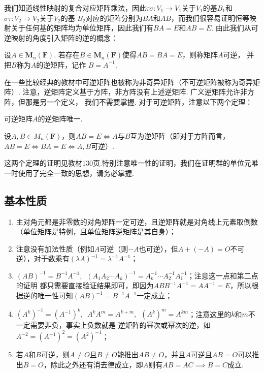我们知道线性映射的复合对应矩阵乘法，因此$\tau\sigma:V_1\to V_1$关于$V_1$的基$B_1$和$\sigma\tau:V_2\to V_2$关于$V_2$的基
$B_2$对应的矩阵分别为$BA$和$AB$，而我们很容易证明恒等映射关于任何基的矩阵均为单位矩阵，因此我们有$BA=E$和$AB=E$.
由此我们从可逆映射的角度引入矩阵的逆的概念：
\begin{definition}
    设$A \in \mathbf{M}_n(\mathbf{F})$. 若存在$B \in \mathbf{M}_n(\mathbf{F})$使得$AB=BA=E$，则称矩阵$A$可逆，
    并把$B$称为$A$的逆矩阵，记作 $ B = A^{-1} $.
\end{definition}
在一些比较经典的教材中可逆矩阵也被称为非奇异矩阵（不可逆矩阵被称为奇异矩阵）.
注意，逆矩阵定义基于方阵，非方阵没有上述逆矩阵. 广义逆矩阵允许非方阵，但那是另一个定义，
我们不需要掌握. 对于可逆矩阵，注意以下两个定理：
\begin{theorem}
    可逆矩阵$A$的逆矩阵唯一.
\end{theorem}
\begin{theorem}
    设$A,B\in M_n(\mathbf{F})$，则$AB=E \iff A$与$B$互为逆矩阵（即对于方阵而言，$AB=E\iff BA=E\iff A,B$可逆）.
\end{theorem}
这两个定理的证明见教材130页.特别注意唯一性的证明，我们在证明群的单位元唯一时使用了完全一致的思想，请务必掌握.

\subsection{基本性质}
\begin{enumerate}
    \item 主对角元都是非零数的对角矩阵一定可逆，且逆矩阵就是对角线上元素取倒数（单位矩阵是特例，且单位矩阵逆矩阵是其自身）；

    \item 注意没有加法性质（例如$A$可逆（则$-A$也可逆），但$A+(-A)=O$不可逆），对于数乘有$(\lambda A)^{-1}=\lambda^{-1}A^{-1}$；

    \item $(AB)^{-1}=B^{-1}A^{-1},\enspace (A_1A_2\cdots A_k)^{-1}=A_k^{-1}\cdots A_2^{-1}A_1^{-1}$；注意这一点和第二点的证明
    都只需要直接验证结果即可，即因为$ABB^{-1}A^{-1}=AA^{-1}=E$，所以根据逆的唯一性可知$(AB)^{-1}=B^{-1}A^{-1}$一定成立；

    \item $(A^k)^{-1}=(A^{-1})^k,\enspace A^kA^m=A^{k+m},\enspace (A^k)^m=A^{km}$；注意这里的$k$和$m$不一定需要非负，事实上负数就是
    逆矩阵的幂次或幂次的逆，如$A^{-2}=(A^{-1})^2=(A^2)^{-1}$；

    \item 若$A$和$B$可逆，则$A\neq O$且$B\neq O$能推出$AB\neq O$，并且$A$可逆且$AB=O$可以推出$B=O$，除此之外还有消去律成立，即$A$则有$AB=AC \implies B=C$成立.
\end{enumerate}

